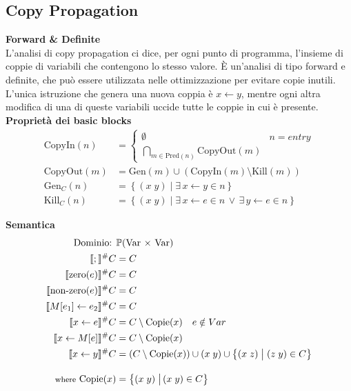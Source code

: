 \documentclass[a4paper,12pt,openany]{article}
\begin{document}
\clearpage
\subsection{Copy Propagation}
\textbf{Forward \& Definite}\\[1em]
L'analisi di copy propagation ci dice, per ogni punto di programma, l'insieme di coppie di variabili che contengono lo stesso valore. È un'analisi di tipo forward e definite, che può essere utilizzata nelle ottimizzazione per evitare copie inutili. L'unica istruzione che genera una nuova coppia è $x\leftarrow y$, mentre ogni altra modifica di una di queste variabili uccide tutte le coppie in cui è presente.\\[1em]
\noindent\textbf{Proprietà dei basic blocks}
\begin{align*}
    \mbox{CopyIn}(n) &=
    \begin{cases}
    \emptyset & n = entry\\
    \bigcap\limits_{m\in \mbox{Pred}(n)} \mbox{CopyOut}(m)
    \end{cases}\\
    \mbox{CopyOut}(m) &= \mbox{Gen}(m) \cup (\mbox{CopyIn}(m) \setminus \mbox{Kill}(m))\\
    \mbox{Gen}_{C}(n) &= \left\{
    (x\; y) \;\big\vert\; \exists\, x\leftarrow y \in n
    \right\}\\
    \mbox{Kill}_{C}(n) &= \left\{
    (x\; y) \;\big\vert\; \exists\, x\leftarrow e \in n \,\lor\, \exists\, y\leftarrow e \in n
    \right\}
\end{align*}

\textbf{Semantica}
\begin{align*}
    \mbox{Dominio: }& \mathbb{P}(\mbox{Var $\times$ Var})\\
    \llbracket ; \rrbracket^\#C &= C\\
    \llbracket \mbox{zero}(e) \rrbracket^\#C &= C\\
    \llbracket \mbox{non-zero}(e) \rrbracket^\#C &= C\\
    \llbracket M[e_1]\leftarrow e_2 \rrbracket^\#C &= C\\
    \llbracket x \leftarrow e \rrbracket^\#C &= C\setminus \mbox{Copie}(x)\quad e\notin Var\\
    \llbracket x \leftarrow M[e] \rrbracket^\#C &= C\setminus \mbox{Copie}(x)\\
    \llbracket x\leftarrow y \rrbracket^\#C &= (C\setminus \mbox{Copie}(x)) \cup (x\;y) \cup
    \left\{
        (x\; z) \;\big\vert\; (z\; y) \in C
    \right\}\\[1em]
    \mbox{{\footnotesize where} Copie}(x) &=
    \left\{
    (x\; y) \;\big\vert\, (x\; y) \in C
    \right\}\\
\end{align*}
\end{document}

